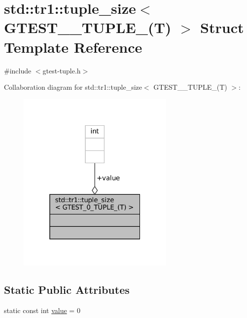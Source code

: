 \hypertarget{structstd_1_1tr1_1_1tuple__size_3_01GTEST__0__TUPLE___07T_08_01_4}{}\section{std\+:\+:tr1\+:\+:tuple\+\_\+size$<$ G\+T\+E\+S\+T\+\_\+\_\+\+T\+U\+P\+L\+E\+\_\+(T) $>$ Struct Template Reference}
\label{structstd_1_1tr1_1_1tuple__size_3_01GTEST__0__TUPLE___07T_08_01_4}


{\ttfamily \#include $<$gtest-\/tuple.\+h$>$}



Collaboration diagram for std\+:\+:tr1\+:\+:tuple\+\_\+size$<$ G\+T\+E\+S\+T\+\_\+\_\+\+T\+U\+P\+L\+E\+\_\+(T) $>$\+:
\nopagebreak
\begin{figure}[H]
\begin{center}
\leavevmode
\includegraphics[width=217pt]{structstd_1_1tr1_1_1tuple__size_3_01GTEST__0__TUPLE___07T_08_01_4__coll__graph}
\end{center}
\end{figure}
\subsection*{Static Public Attributes}
\begin{DoxyCompactItemize}
\item 
static const int \hyperlink{structstd_1_1tr1_1_1tuple__size_3_01GTEST__0__TUPLE___07T_08_01_4_af34d6d0b87d7379b14817a386c1e18ee}{value} = 0
\end{DoxyCompactItemize}



